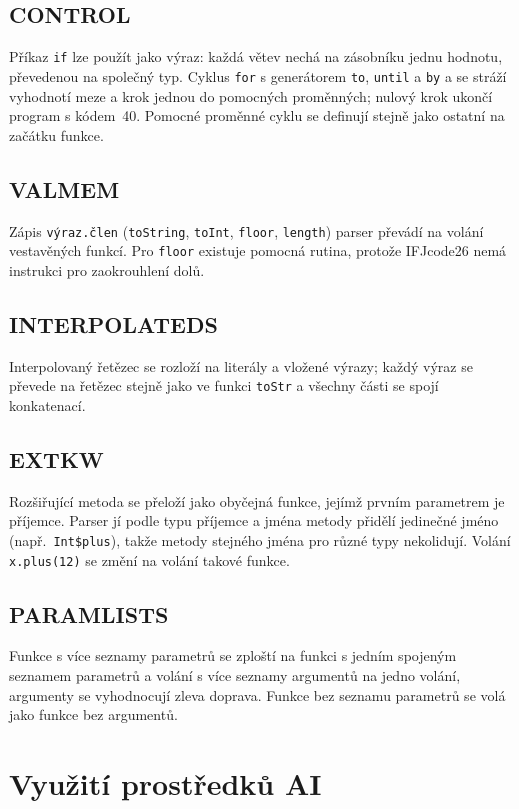 \documentclass[11pt]{article}
\newif\ifdraft
\newcommand{\todo}[1]{\ifdraft{\color{red}\textbf{[TODO: #1]}}\fi}
\begin{document}
\subsection{CONTROL}
Příkaz \texttt{if} lze použít jako výraz: každá větev nechá na zásobníku jednu hodnotu, převedenou na společný typ. Cyklus \texttt{for} s generátorem \texttt{to}, \texttt{until} a \texttt{by} a se stráží vyhodnotí meze a krok jednou do pomocných proměnných; nulový krok ukončí program s kódem~40. Pomocné proměnné cyklu se definují stejně jako ostatní na začátku funkce.

\subsection{VALMEM}
Zápis \texttt{výraz.člen} (\texttt{toString}, \texttt{toInt}, \texttt{floor}, \texttt{length}) parser převádí na volání vestavěných funkcí. Pro \texttt{floor} existuje pomocná rutina, protože IFJcode26 nemá instrukci pro zaokrouhlení dolů.

\subsection{INTERPOLATEDS}
Interpolovaný řetězec se rozloží na literály a vložené výrazy; každý výraz se převede na řetězec stejně jako ve funkci \texttt{toStr} a všechny části se spojí konkatenací.

\subsection{EXTKW}
Rozšiřující metoda se přeloží jako obyčejná funkce, jejímž prvním parametrem je příjemce. Parser jí podle typu příjemce a jména metody přidělí jedinečné jméno (např.\ \texttt{Int\$plus}), takže metody stejného jména pro různé typy nekolidují. Volání \texttt{x.plus(12)} se změní na volání takové funkce.

\subsection{PARAMLISTS}
Funkce s více seznamy parametrů se zploští na funkci s jedním spojeným seznamem parametrů a volání s více seznamy argumentů na jedno volání, argumenty se vyhodnocují zleva doprava. Funkce bez seznamu parametrů se volá jako funkce bez argumentů.

\section{Využití prostředků AI}
\todo{popsat podle požadavků sekce 4 hlavního zadání: jaké nástroje AI, k čemu (např.\ generátor kódu, testy, dokumentace), co z výstupu bylo převzato nebo upraveno a jak jsme výsledek ověřili (testy, ruční kontrola, srovnání se Scalou)}
\end{document}
